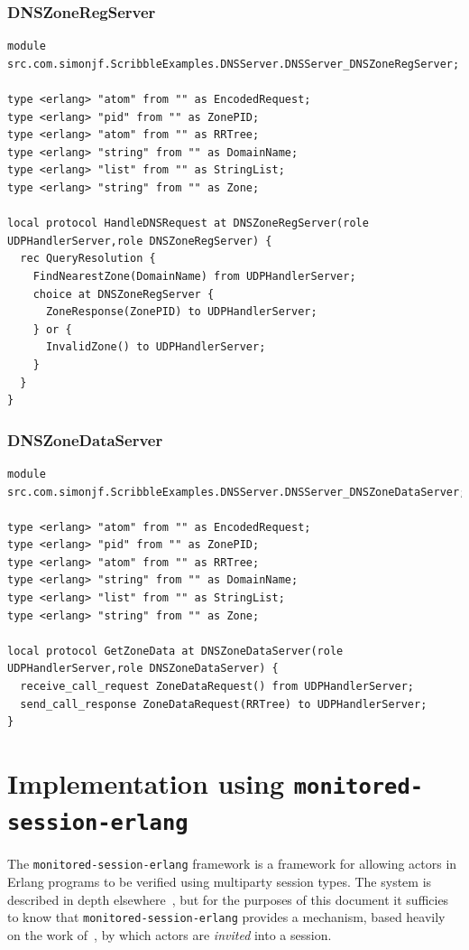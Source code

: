 \documentclass[a4paper]{article}
\newcommand{\mse}[0]{\texttt{monitored-session-erlang}}
\begin{document}
\subsubsection{DNSZoneRegServer}
\begin{minipage}{\textwidth}
\begin{lstlisting}[language=scribble]
module src.com.simonjf.ScribbleExamples.DNSServer.DNSServer_DNSZoneRegServer;

type <erlang> "atom" from "" as EncodedRequest;
type <erlang> "pid" from "" as ZonePID;
type <erlang> "atom" from "" as RRTree;
type <erlang> "string" from "" as DomainName;
type <erlang> "list" from "" as StringList;
type <erlang> "string" from "" as Zone;

local protocol HandleDNSRequest at DNSZoneRegServer(role UDPHandlerServer,role DNSZoneRegServer) {
  rec QueryResolution {
    FindNearestZone(DomainName) from UDPHandlerServer;
    choice at DNSZoneRegServer {
      ZoneResponse(ZonePID) to UDPHandlerServer;
    } or {
      InvalidZone() to UDPHandlerServer;
    }
  }
}
\end{lstlisting}
\end{minipage}

\subsubsection{DNSZoneDataServer}
\begin{minipage}{\textwidth}
\begin{lstlisting}[language=scribble]
module src.com.simonjf.ScribbleExamples.DNSServer.DNSServer_DNSZoneDataServer;

type <erlang> "atom" from "" as EncodedRequest;
type <erlang> "pid" from "" as ZonePID;
type <erlang> "atom" from "" as RRTree;
type <erlang> "string" from "" as DomainName;
type <erlang> "list" from "" as StringList;
type <erlang> "string" from "" as Zone;

local protocol GetZoneData at DNSZoneDataServer(role UDPHandlerServer,role DNSZoneDataServer) {
  receive_call_request ZoneDataRequest() from UDPHandlerServer;
  send_call_response ZoneDataRequest(RRTree) to UDPHandlerServer;
}
\end{lstlisting}
\end{minipage}

\section{Implementation using \mse{}}
The \mse{} framework is a framework for allowing actors in Erlang programs to be verified using multiparty session types. The system is described in depth elsewhere~\cite{fowler:msc}, but for the purposes of this document it sufficies to know that \mse{} provides a mechanism, based heavily on the work of~\cite{neykova:actors}, by which actors are \emph{invited} into a session.
\end{document}
